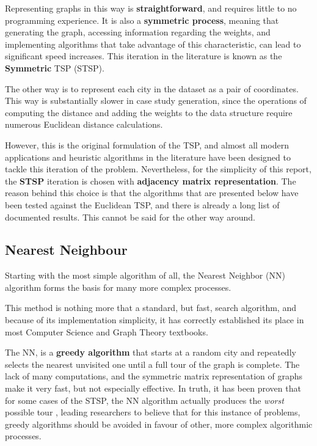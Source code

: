 Representing graphs in this way is \textbf{straightforward}, and requires little to no programming experience. It is also a \textbf{symmetric process}, meaning that generating the graph, accessing information regarding the weights, and implementing algorithms that take advantage of this characteristic, can lead to significant speed increases. This iteration in the literature is known as the \textbf{Symmetric} TSP (STSP).

The other way is to represent each city in the dataset as a pair of coordinates. This way is substantially slower in case study generation, since the operations of computing the distance and adding the weights to the data structure require numerous Euclidean distance calculations.

However, this is the original formulation of the TSP, and almost all modern applications and heuristic algorithms in the literature have been designed to tackle this iteration of the problem. Nevertheless, for the simplicity of this report, the \textbf{STSP} iteration is chosen with \textbf{adjacency matrix representation}. The reason behind this choice is that the algorithms that are presented below have been tested against the Euclidean TSP, and there is already a long list of documented results. This cannot be said for the other way around.

\subsection{Nearest Neighbour}
\label{subsec: NN}

Starting with the most simple algorithm of all, the Nearest Neighbor (NN) algorithm forms the basis for many more complex processes.

This method is nothing more that a standard, but fast, search algorithm, and because of its implementation simplicity, it has correctly established its place in most Computer Science and Graph Theory textbooks.

The NN, is a \textbf{greedy algorithm} that starts at a random city and repeatedly selects the nearest unvisited one until a full tour of the graph is complete. The lack of many computations, and the symmetric matrix representation of graphs make it very fast, but not especially effective. In truth, it has been proven that for some cases of the STSP, the NN algorithm actually produces the \textit{worst} possible tour \cite{gutin2002traveling}, leading researchers to believe that for this instance of problems, greedy algorithms should be avoided in favour of other, more complex algorithmic processes.

